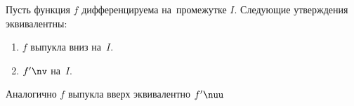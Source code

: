 
    Пусть функция $f$ дифференцируема на~промежутке $I$. Следующие утверждения эквивалентны:

    \begin{enumerate}
        \item $f$ выпукла вниз на~$I$.

        \item $f'\nv$ на~$I$.
    \end{enumerate}

    Аналогично $f$ выпукла вверх эквивалентно $f'\nuu$
